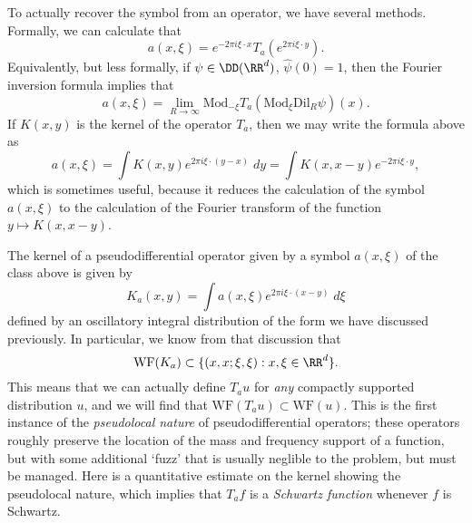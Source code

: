 To actually recover the symbol from an operator, we have several methods. Formally, we can calculate that
%
\[ a(x,\xi) = e^{-2 \pi i \xi \cdot x} T_a(e^{2 \pi i \xi \cdot y}). \]
%
Equivalently, but less formally, if $\psi \in \DD(\RR^d)$, $\widehat{\psi}(0) = 1$, then the Fourier inversion formula implies that
%
\[ a(x,\xi) = \lim_{R \to \infty} \text{Mod}_{-\xi} T_a(\text{Mod}_{\xi} \text{Dil}_R \psi) (x). \]
%
If $K(x,y)$ is the kernel of the operator $T_a$, then we may write the formula above as
%
\[ a(x,\xi) = \int K(x,y) e^{2 \pi i \xi \cdot (y-x)}\; dy = \int K(x,x - y) e^{-2 \pi i \xi \cdot y}, \]
%
which is sometimes useful, because it reduces the calculation of the symbol $a(x,\xi)$ to the calculation of the Fourier transform of the function $y \mapsto K(x,x-y)$.

The kernel of a pseudodifferential operator given by a symbol $a(x,\xi)$ of the class above is given by
%
\[ K_a(x,y) = \int a(x,\xi) e^{2 \pi i \xi \cdot (x - y)}\; d\xi \]
%
defined by an oscillatory integral distribution of the form we have discussed previously. In particular, we know from that discussion that
%
\[ \text{WF}(K_a) \subset \{ (x,x;\xi,\xi) : x, \xi \in \RR^d \}. \]
%
This means that we can actually define $T_a u$ for \emph{any} compactly supported distribution $u$, and we will find that $\text{WF}(T_a u) \subset \text{WF}(u)$. This is the first instance of the \emph{pseudolocal nature} of pseudodifferential operators; these operators roughly preserve the location of the mass and frequency support of a function, but with some additional `fuzz' that is usually neglible to the problem, but must be managed. Here is a quantitative estimate on the kernel showing the pseudolocal nature, which implies that $T_a f$ is a \emph{Schwartz function} whenever $f$ is Schwartz.

